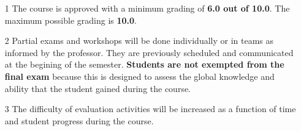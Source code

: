 \documentclass[letterpaper,11pt]{article}
\begin{document}
\begin{itemize}
\item[1] The course is approved with a minimum grading of \textbf{6.0 out of 10.0}. The maximum possible grading is \textbf{10.0}.
\item[2] Partial exams and workshops will be done individually or in teams as informed by the professor. They are previously scheduled and communicated at the begining of the semester. \textbf{Students are not exempted from the final exam} because this is designed to assess the global knowledge and ability that the student gained during the course.
\item[3] The difficulty of evaluation activities will be increased as a function of time and student progress during the course. 
\end{itemize}
\end{document}
